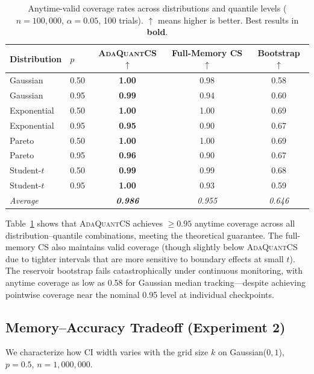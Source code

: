 \documentclass{article}
\newcommand{\ours}{\textsc{AdaQuantCS}}
\begin{document}
\begin{table}[t]
\caption{Anytime-valid coverage rates across distributions and quantile levels ($n = 100{,}000$, $\alpha = 0.05$, 100 trials). $\uparrow$ means higher is better. Best results in \textbf{bold}.}
\label{tab:coverage}
\centering
\begin{tabular}{llccc}
\toprule
Distribution & $p$ & \ours{} $\uparrow$ & Full-Memory CS $\uparrow$ & Bootstrap $\uparrow$ \\
\midrule
Gaussian     & 0.50 & \textbf{1.00} & 0.98 & 0.58 \\
Gaussian     & 0.95 & \textbf{0.99} & 0.94 & 0.60 \\
Exponential  & 0.50 & \textbf{1.00} & 1.00 & 0.69 \\
Exponential  & 0.95 & \textbf{0.95} & 0.90 & 0.67 \\
Pareto       & 0.50 & \textbf{1.00} & 1.00 & 0.69 \\
Pareto       & 0.95 & \textbf{0.96} & 0.90 & 0.67 \\
Student-$t$  & 0.50 & \textbf{0.99} & 0.99 & 0.68 \\
Student-$t$  & 0.95 & \textbf{1.00} & 0.93 & 0.59 \\
\midrule
\textit{Average} & & \textit{\textbf{0.986}} & \textit{0.955} & \textit{0.646} \\
\bottomrule
\end{tabular}
\end{table}

Table~\ref{tab:coverage} shows that \ours{} achieves $\geq 0.95$ anytime coverage across all distribution--quantile combinations, meeting the theoretical guarantee. The full-memory CS also maintains valid coverage (though slightly below \ours{} due to tighter intervals that are more sensitive to boundary effects at small $t$). The reservoir bootstrap fails catastrophically under continuous monitoring, with anytime coverage as low as 0.58 for Gaussian median tracking---despite achieving pointwise coverage near the nominal 0.95 level at individual checkpoints.

\subsection{Memory--Accuracy Tradeoff (Experiment 2)}

We characterize how CI width varies with the grid size $k$ on Gaussian($0,1$), $p = 0.5$, $n = 1{,}000{,}000$.
\end{document}
